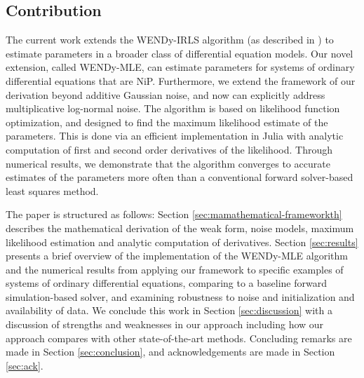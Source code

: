 \subsection{Contribution}
The current work extends the WENDy-IRLS algorithm (as described in \citep{BortzMessengerDukic2023BullMathBiol}) to estimate parameters in a broader class of differential equation models. Our novel extension, called WENDy-MLE, can estimate parameters for systems of ordinary differential equations that are NiP. Furthermore, we  extend the framework of our derivation beyond additive Gaussian noise, and now can explicitly address multiplicative log-normal noise. The algorithm is based on  likelihood function optimization, and designed to find the maximum likelihood estimate of the parameters. This is done via an efficient implementation in Julia \citep{BezansonEdelmanKarpinskiEtAl2017SIAMRev} with analytic computation of first and second order derivatives of the likelihood.  Through numerical results, we demonstrate that the algorithm converges to accurate estimates of the parameters more often than a conventional forward solver-based least squares method.  

The paper is structured as follows: Section \ref{sec:mamathematical-frameworkth} describes the mathematical derivation of the weak form, noise models, maximum likelihood estimation and analytic computation of derivatives. Section \ref{sec:results} presents a brief overview of the implementation of the WENDy-MLE algorithm and the numerical results from applying our framework to specific examples of systems of ordinary differential equations, comparing to a baseline forward simulation-based solver, and examining robustness to noise and initialization and availability of data. We conclude this work in Section \ref{sec:discussion} with a discussion of strengths and weaknesses in our approach including how our approach compares with other state-of-the-art methods. Concluding remarks are made in Section \ref{sec:conclusion}, and acknowledgements are made in Section \ref{sec:ack}.